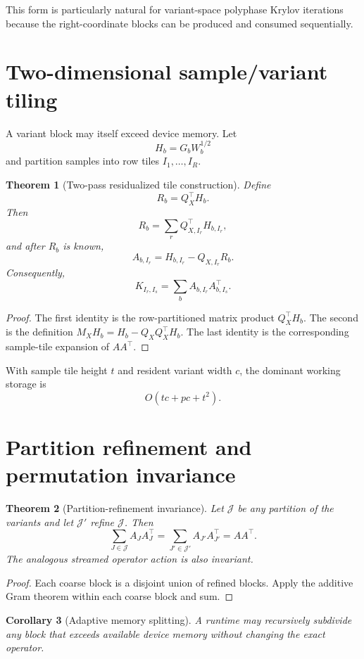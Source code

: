 \documentclass[11pt]{article}
\newtheorem{theorem}{Theorem}[section]
\newtheorem{corollary}[theorem]{Corollary}
\theoremstyle{definition}
\theoremstyle{remark}
\begin{document}
This form is particularly natural for variant-space polyphase Krylov
iterations because the right-coordinate blocks can be produced and consumed
sequentially.

\section{Two-dimensional sample/variant tiling}

A variant block may itself exceed device memory.  Let
\[
H_b=G_bW_b^{1/2}
\]
and partition samples into row tiles \(I_1,\ldots,I_R\).

\begin{theorem}[Two-pass residualized tile construction]
Define
\[
R_b=Q_X^\top H_b.
\]
Then
\[
\boxed{
R_b
=
\sum_r
Q_{X,I_r}^\top H_{b,I_r},
}
\]
and after \(R_b\) is known,
\[
\boxed{
A_{b,I_r}
=
H_{b,I_r}-Q_{X,I_r}R_b.
}
\]
Consequently,
\[
\boxed{
K_{I_r,I_s}
=
\sum_b
A_{b,I_r}A_{b,I_s}^\top.
}
\]
\end{theorem}

\begin{proof}
The first identity is the row-partitioned matrix product
\(Q_X^\top H_b\).  The second is the definition
\(M_XH_b=H_b-Q_XQ_X^\top H_b\).  The last identity is the corresponding
sample-tile expansion of \(AA^\top\).
\end{proof}

With sample tile height \(t\) and resident variant width \(c\), the dominant
working storage is
\[
O(tc+pc+t^2).
\]

\section{Partition refinement and permutation invariance}

\begin{theorem}[Partition-refinement invariance]
Let \(\mathcal J\) be any partition of the variants and let
\(\mathcal J'\) refine \(\mathcal J\).  Then
\[
\boxed{
\sum_{J\in\mathcal J}A_JA_J^\top
=
\sum_{J'\in\mathcal J'}A_{J'}A_{J'}^\top
=
AA^\top.
}
\]
The analogous streamed operator action is also invariant.
\end{theorem}

\begin{proof}
Each coarse block is a disjoint union of refined blocks.  Apply the additive
Gram theorem within each coarse block and sum.
\end{proof}

\begin{corollary}[Adaptive memory splitting]
A runtime may recursively subdivide any block that exceeds available device
memory without changing the exact operator.
\end{corollary}
\end{document}
